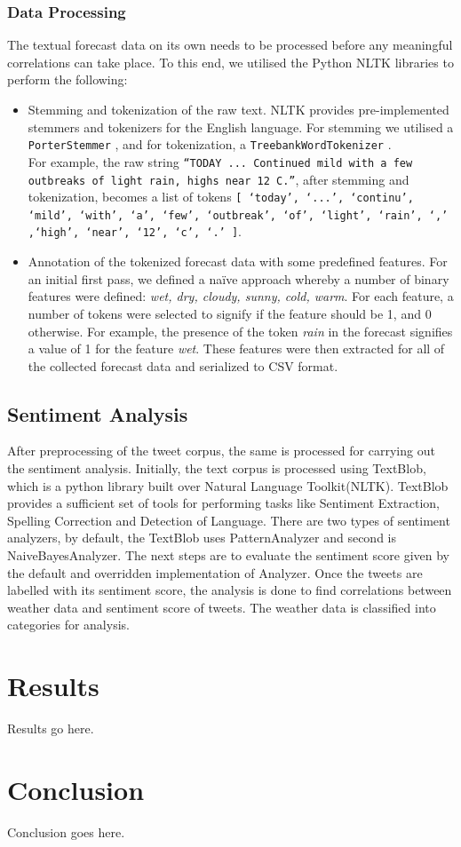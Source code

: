 \documentclass[a4paper,10pt]{article}
\begin{document}
    \subsubsection{Data Processing}

    The textual forecast data on its own needs to be processed before any meaningful correlations can take place. To this end, we utilised the Python NLTK libraries to perform the following:
    \begin{itemize}
        \item{
            Stemming and tokenization of the raw text. NLTK provides pre-implemented stemmers and tokenizers for the English language. For stemming we utilised a \texttt{PorterStemmer} , and for tokenization, a \texttt{TreebankWordTokenizer} . \\
            For example, the raw string \texttt{``TODAY ... Continued mild with a few outbreaks of light rain, highs near 12 C.''}, after stemming and tokenization, becomes a list of tokens \texttt{[ `today', `...', `continu', `mild', `with', `a', `few', `outbreak', `of', `light', `rain', `,' ,`high', `near', `12', `c', `.' ]}.
        }
        \item{
            Annotation of the tokenized forecast data with some predefined features. For an initial first pass, we defined a na\"{i}ve approach whereby a number of binary features were defined: \textit{wet, dry, cloudy, sunny, cold, warm}. For each feature, a number of tokens were selected to signify if the feature should be 1, and 0 otherwise. For example, the presence of the token \textit{rain} in the forecast signifies a value of 1 for the feature \textit{wet}. These features were then extracted for all of the collected forecast data and serialized to CSV format.
        }
    \end{itemize}

	\subsection{Sentiment Analysis}
	
	After preprocessing of the tweet corpus, the same is processed for carrying out the sentiment analysis. Initially, the text corpus is processed using TextBlob, which is a python library built over Natural Language Toolkit(NLTK). TextBlob provides a sufficient set of tools for performing tasks like Sentiment Extraction, Spelling Correction and Detection of Language. There are two types of sentiment analyzers, by default, the TextBlob uses PatternAnalyzer and second is NaiveBayesAnalyzer. The next steps are to evaluate the sentiment score given by the default and overridden implementation of Analyzer. Once the tweets are labelled with its sentiment score, the analysis is done to find correlations between weather data and sentiment score of tweets. The weather data is classified into categories for analysis. 


    \section{Results}

    Results go here.

    \section{Conclusion}

    Conclusion goes here.
\end{document}
